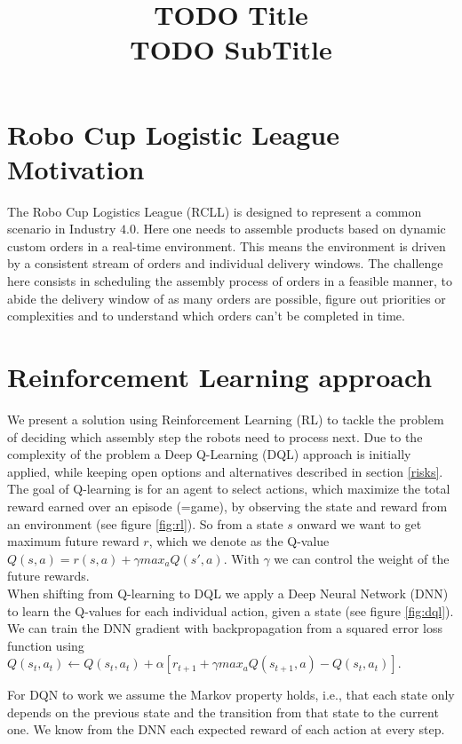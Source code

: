 \documentclass[runningheads,envcountsect]{llncs}
\title{{\huge TODO Title}\\{\LARGE \vspace{4pt} TODO SubTitle}}
\author{}
\institute{}
\begin{document}
\maketitle

\section{Robo Cup Logistic League Motivation}
The Robo Cup Logistics League (RCLL) is designed to represent a common scenario in Industry $4.0$. Here one needs to assemble products based on dynamic custom orders in a real-time environment. This means the environment is driven by a consistent stream of orders and individual delivery windows. The challenge here consists in scheduling the assembly process of orders in a feasible manner, to abide the delivery window of as many orders are possible, figure out priorities or complexities and to understand which orders can't be completed in time.

\section{Reinforcement Learning approach}
We present a solution using Reinforcement Learning (RL) to tackle the problem of deciding which assembly step the robots need to process next. Due to the complexity of the problem a Deep Q-Learning (DQL) approach is initially applied, while keeping open options and alternatives described in section \ref{risks}.\\
The goal of Q-learning is for an agent to select actions, which maximize the total reward earned over an episode (=game), by observing the state and reward from an environment (see figure \ref{fig:rl}). So from a state $s$ onward we want to get maximum future reward $r$, which we denote as the Q-value $Q(s,a)=r(s,a)+\gamma max_a Q(s',a)$. With $\gamma$ we can control the weight of the future rewards.\\
When shifting from Q-learning to DQL we apply a Deep Neural Network (DNN) to learn the Q-values for each individual action, given a state (see figure \ref{fig:dql}). We can train the DNN gradient with backpropagation from a squared error loss function using $Q(s_t, a_t) \leftarrow Q(s_t, a_t) + \alpha [r_{t+1} + \gamma max_a Q(s_{t+1}, a) - Q(s_t, a_t)]$.

For DQN to work we assume the Markov property holds, i.e., that each state only depends on the previous state and the transition from that state to the current one.
We know from the DNN each expected reward of each action at every step.
\end{document}
